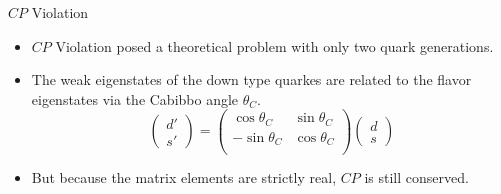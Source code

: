 \documentclass{beamer}
\begin{document}
\begin{frame}{$CP$ Violation}
  \begin{itemize}
    \item $CP$ Violation posed a theoretical problem with only two quark generations.
    \item The weak eigenstates of the down type quarkes are related to the flavor eigenstates via the Cabibbo angle $\theta_C$.
      \begin{equation*}
        \begin{pmatrix} d' \\ s' \end{pmatrix} =
        \begin{pmatrix}
          \cos\theta_C & \sin\theta_C \\
          -\sin\theta_C & \cos\theta_C \\
        \end{pmatrix}
        \begin{pmatrix} d \\ s \end{pmatrix}
      \end{equation*}
    \item But because the matrix elements are strictly real, $CP$ is still conserved.
  \end{itemize}
\end{frame}
\end{document}
